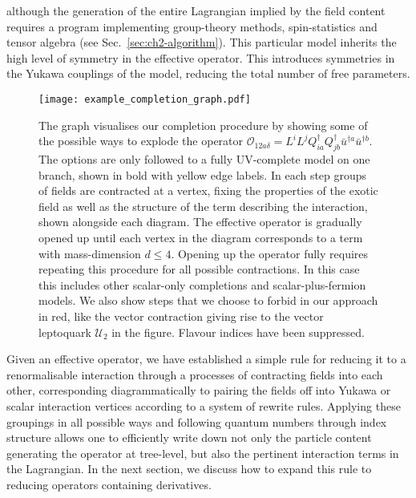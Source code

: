 although the generation of the entire Lagrangian implied by the field content
requires a program implementing group-theory methods, spin-statistics and tensor
algebra (see Sec.~\ref{sec:ch2-algorithm}). This particular model inherits the high
level of symmetry in the effective operator. This introduces symmetries in the
Yukawa couplings of the model, reducing the total number of free parameters.

\begin{figure}
  \centering
  \texttt{[image: example\_completion\_graph.pdf]}
  \caption[The graph visualises our completion procedure by showing some of the
  possible ways to explode the operator
  $\mathcal{O}_{12a\delta} = L^{i} L^{j} Q^{\dagger}_{ia} Q^{\dagger}_{jb} \bar{u}^{\dagger a} \bar{u}^{\dagger b}$.]{The
    graph visualises our completion procedure by showing some of the possible
    ways to explode the operator
    $\mathcal{O}_{12a\delta} = L^{i} L^{j} Q^{\dagger}_{ia} Q^{\dagger}_{jb} \bar{u}^{\dagger a} \bar{u}^{\dagger b}$.
    The options are only followed to a fully UV-complete model on one branch,
    shown in bold with yellow edge labels. In each step groups of fields are
    contracted at a vertex, fixing the properties of the exotic field as well as
    the structure of the term describing the interaction, shown alongside each
    diagram. The effective operator is gradually opened up until each vertex in
    the diagram corresponds to a term with mass-dimension $d \leq 4$. Opening up
    the operator fully requires repeating this procedure for all possible
    contractions. In this case this includes other scalar-only completions and
    scalar-plus-fermion models. We also show steps that we choose to forbid in
    our approach in red, like the vector contraction giving rise to the vector
    leptoquark $\mathcal{U}_{2}$ in the figure. Flavour indices have been
    suppressed.}
  \label{fig:ch2-example-completion-graph}
\end{figure}

Given an effective operator, we have established a simple rule for reducing it
to a renormalisable interaction through a processes of contracting fields into
each other, corresponding diagrammatically to pairing the fields off into Yukawa
or scalar interaction vertices according to a system of rewrite rules. Applying
these groupings in all possible ways and following quantum numbers through index
structure allows one to efficiently write down not only the particle content
generating the operator at tree-level, but also the pertinent interaction terms
in the Lagrangian. In the next section, we discuss how to expand this rule to
reducing operators containing derivatives.

